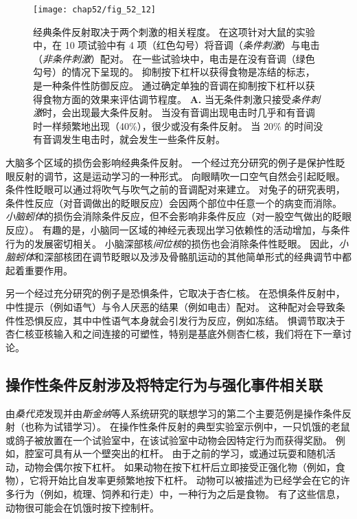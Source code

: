 \begin{figure}[htbp]
	\centering
	\texttt{[image: chap52/fig\_52\_12]}
	\caption{经典条件反射取决于两个刺激的相关程度。
		在这项针对大鼠的实验中，在 10 项试验中有 4 项（红色勾号）将音调（\textit{条件刺激}）与电击（\textit{非条件刺激}）配对。
		在一些试验块中，电击是在没有音调（绿色勾号）的情况下呈现的。
		抑制按下杠杆以获得食物是冻结的标志，是一种条件性防御反应。
		通过确定单独的音调在抑制按下杠杆以获得食物方面的效果来评估调节程度\cite{rescorla1968probability}。
		\textbf{A.} 当无条件刺激只接受\textit{条件刺激}时，会出现最大条件反射。 
		当没有音调出现电击时几乎和有音调时一样频繁地出现（40\%），很少或没有条件反射。
		当 20\% 的时间没有音调发生电击时，就会发生一些条件反射。}
	\label{fig:52_12}
\end{figure}


大脑多个区域的损伤会影响经典条件反射。
一个经过充分研究的例子是保护性眨眼反射的调节，这是运动学习的一种形式。
向眼睛吹一口空气自然会引起眨眼。
条件性眨眼可以通过将吹气与吹气之前的音调配对来建立。
对兔子的研究表明，条件性反应（对音调做出的眨眼反应）会因两个部位中任意一个的病变而消除。
\textit{小脑蚓体}的损伤会消除条件反应，但不会影响非条件反应（对一股空气做出的眨眼反应）。
有趣的是，小脑同一区域的神经元表现出学习依赖性的活动增加，与条件行为的发展密切相关。
小脑深部核\textit{间位核}的损伤也会消除条件性眨眼。
因此，\textit{小脑蚓体}和深部核团在调节眨眼以及涉及骨骼肌运动的其他简单形式的经典调节中都起着重要作用。


另一个经过充分研究的例子是恐惧条件，它取决于杏仁核。
在恐惧条件反射中，中性提示（例如语气）与令人厌恶的结果（例如电击）配对。
这种配对会导致条件性恐惧反应，其中中性语气本身就会引发行为反应，例如冻结。
惧调节取决于杏仁核亚核输入和之间连接的可塑性，特别是基底外侧杏仁核，我们将在下一章讨论。



\subsection{操作性条件反射涉及将特定行为与强化事件相关联}

由\textit{桑代克}发现并由\textit{斯金纳}等人系统研究的联想学习的第二个主要范例是操作条件反射（也称为试错学习）。
在操作性条件反射的典型实验室示例中，一只饥饿的老鼠或鸽子被放置在一个试验室中，在该试验室中动物会因特定行为而获得奖励。
例如，腔室可具有从一个壁突出的杠杆。 由于之前的学习，或通过玩耍和随机活动，动物会偶尔按下杠杆。
如果动物在按下杠杆后立即接受正强化物（例如，食物），它将开始比自发率更频繁地按下杠杆。
动物可以被描述为已经学会在它的许多行为（例如，梳理、饲养和行走）中，一种行为之后是食物。
有了这些信息，动物很可能会在饥饿时按下控制杆。



